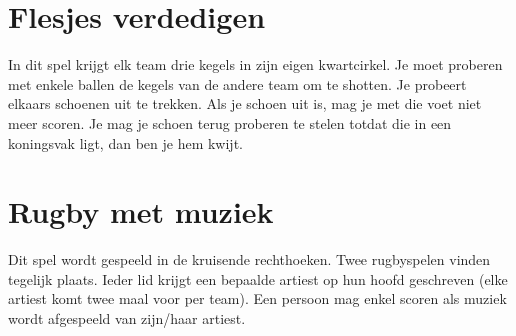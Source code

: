 \documentclass{article}
\begin{document}
\section{Flesjes verdedigen}
In dit spel krijgt elk team drie kegels in zijn eigen kwartcirkel. Je moet proberen met enkele ballen de kegels van de andere team om te shotten. Je probeert elkaars schoenen uit te trekken. Als je schoen uit is, mag je met die voet niet meer scoren. Je mag je schoen terug proberen te stelen totdat die in een koningsvak ligt, dan ben je hem kwijt.

\section{Rugby met muziek}
Dit spel wordt gespeeld in de kruisende rechthoeken. Twee rugbyspelen vinden tegelijk plaats. Ieder lid krijgt een bepaalde artiest op hun hoofd geschreven (elke artiest komt twee maal voor per team). Een persoon mag enkel scoren als muziek wordt afgespeeld van zijn/haar artiest.
\end{document}

